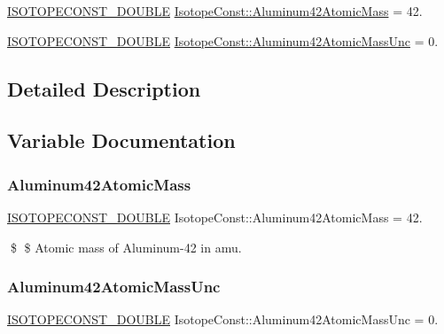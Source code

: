 \begin{DoxyCompactItemize}
\item 
\mbox{\hyperlink{group___isotope_const-_macros_ga8f45a7272ce02c0b4c65c44636ed719a}{I\+S\+O\+T\+O\+P\+E\+C\+O\+N\+S\+T\+\_\+\+D\+O\+U\+B\+LE}} \mbox{\hyperlink{group___isotope_const-_aluminum-_al42_ga41380489b1f5a8b108fd5a00d93189e6}{Isotope\+Const\+::\+Aluminum42\+Atomic\+Mass}} = 42.
\item 
\mbox{\hyperlink{group___isotope_const-_macros_ga8f45a7272ce02c0b4c65c44636ed719a}{I\+S\+O\+T\+O\+P\+E\+C\+O\+N\+S\+T\+\_\+\+D\+O\+U\+B\+LE}} \mbox{\hyperlink{group___isotope_const-_aluminum-_al42_ga4984d91c41d5e5de60fdd002ff631177}{Isotope\+Const\+::\+Aluminum42\+Atomic\+Mass\+Unc}} = 0.
\end{DoxyCompactItemize}


\subsection{Detailed Description}


\subsection{Variable Documentation}
\mbox{\label{group___isotope_const-_aluminum-_al42_ga41380489b1f5a8b108fd5a00d93189e6}} 
\subsubsection{\texorpdfstring{Aluminum42\+Atomic\+Mass}{Aluminum42AtomicMass}}
{\footnotesize\ttfamily \mbox{\hyperlink{group___isotope_const-_macros_ga8f45a7272ce02c0b4c65c44636ed719a}{I\+S\+O\+T\+O\+P\+E\+C\+O\+N\+S\+T\+\_\+\+D\+O\+U\+B\+LE}} Isotope\+Const\+::\+Aluminum42\+Atomic\+Mass = 42.}

\$ \$ Atomic mass of Aluminum-\/42 in amu. \mbox{\label{group___isotope_const-_aluminum-_al42_ga4984d91c41d5e5de60fdd002ff631177}} 
\subsubsection{\texorpdfstring{Aluminum42\+Atomic\+Mass\+Unc}{Aluminum42AtomicMassUnc}}
{\footnotesize\ttfamily \mbox{\hyperlink{group___isotope_const-_macros_ga8f45a7272ce02c0b4c65c44636ed719a}{I\+S\+O\+T\+O\+P\+E\+C\+O\+N\+S\+T\+\_\+\+D\+O\+U\+B\+LE}} Isotope\+Const\+::\+Aluminum42\+Atomic\+Mass\+Unc = 0.}


